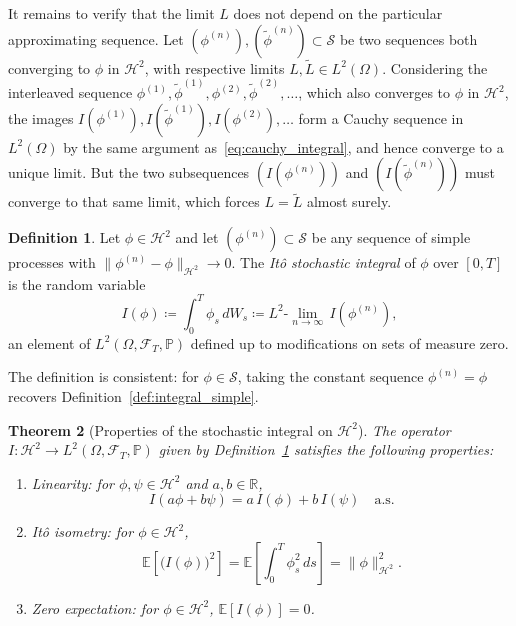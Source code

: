 \documentclass[11pt,a4paper,oneside]{report}
\theoremstyle{plain}
\newtheorem{teorema}{Theorem}[chapter]
\theoremstyle{definition}
\newtheorem{definicion}[teorema]{Definition}
\theoremstyle{remark}
\newcommand{\R}{\mathbb{R}}
\newcommand{\E}{\mathbb{E}}
\newcommand{\PP}{\mathbb{P}}
\newcommand{\F}{\mathcal{F}}
\newcommand{\1}{\mathbf{1}}
\newcommand{\eqdef}{\coloneqq}
\begin{document}
It remains to verify that the limit $L$ does not depend on the
particular approximating sequence. Let
$(\phi^{(n)}), (\widetilde{\phi}^{(n)}) \subset \mathcal{S}$ be two
sequences both converging to $\phi$ in $\mathcal{H}^2$, with
respective limits $L, \widetilde{L} \in L^2(\Omega)$. Considering the
interleaved sequence
$\phi^{(1)}, \widetilde{\phi}^{(1)}, \phi^{(2)}, \widetilde{\phi}^{(2)}, \ldots$,
which also converges to $\phi$ in $\mathcal{H}^2$, the images
$I(\phi^{(1)}), I(\widetilde{\phi}^{(1)}), I(\phi^{(2)}), \ldots$ form
a Cauchy sequence in $L^2(\Omega)$ by the same argument
as~\eqref{eq:cauchy_integral}, and hence converge to a unique limit.
But the two subsequences $(I(\phi^{(n)}))$ and
$(I(\widetilde{\phi}^{(n)}))$ must converge to that same limit, which
forces $L = \widetilde{L}$ almost surely.

\begin{definicion}
\label{def:integral_H2}
Let $\phi \in \mathcal{H}^2$ and let $(\phi^{(n)}) \subset \mathcal{S}$
be any sequence of simple processes with
$\|\phi^{(n)} - \phi\|_{\mathcal{H}^2} \to 0$. The \emph{Itô
stochastic integral} of $\phi$ over $[0, T]$ is the random variable
\begin{equation*}
  I(\phi) \eqdef \int_0^T \phi_s\, dW_s
            \eqdef L^2\text{-}\!\lim_{n \to \infty}\, I(\phi^{(n)}),
\end{equation*}
an element of $L^2(\Omega, \F_T, \PP)$ defined up to modifications on
sets of measure zero.
\end{definicion}

The definition is consistent: for $\phi \in \mathcal{S}$, taking the
constant sequence $\phi^{(n)} = \phi$ recovers
Definition~\ref{def:integral_simple}.

\begin{teorema}[Properties of the stochastic integral on $\mathcal{H}^2$]
\label{teo:propiedades_integral_H2}
The operator $I : \mathcal{H}^2 \to L^2(\Omega, \F_T, \PP)$ given by
Definition~\ref{def:integral_H2} satisfies the following properties:
\begin{enumerate}[label=\textnormal{(\roman*)}]
  \item \emph{Linearity:} for $\phi, \psi \in \mathcal{H}^2$ and
        $a, b \in \R$,
        \begin{equation*}
          I(a\phi + b\psi) = a\, I(\phi) + b\, I(\psi)
          \quad \text{a.s.}
        \end{equation*}
  \item \emph{Itô isometry:} for $\phi \in \mathcal{H}^2$,
        \begin{equation}\label{eq:isometria_H2}
          \E\!\left[\bigl(I(\phi)\bigr)^{\!2}\right]
          = \E\!\left[\int_0^T \phi_s^2\, ds\right]
          = \|\phi\|_{\mathcal{H}^2}^2.
        \end{equation}
  \item \emph{Zero expectation:} for $\phi \in \mathcal{H}^2$,
        $\E[I(\phi)] = 0$.
\end{enumerate}
\end{teorema}
\end{document}
